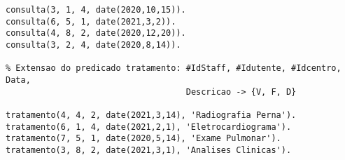 \begin{lstlisting}[caption={Povoamento inicial da Base de Conhecimento com Conhecimento Perfeito Positivo}]
consulta(3, 1, 4, date(2020,10,15)).
consulta(6, 5, 1, date(2021,3,2)).
consulta(4, 8, 2, date(2020,12,20)).
consulta(3, 2, 4, date(2020,8,14)).

% Extensao do predicado tratamento: #IdStaff, #Idutente, #Idcentro, Data,
                                    Descricao -> {V, F, D}
                                    
tratamento(4, 4, 2, date(2021,3,14), 'Radiografia Perna').
tratamento(6, 1, 4, date(2021,2,1), 'Eletrocardiograma').
tratamento(7, 5, 1, date(2020,5,14), 'Exame Pulmonar').
tratamento(3, 8, 2, date(2021,3,1), 'Analises Clinicas').
\end{lstlisting}
